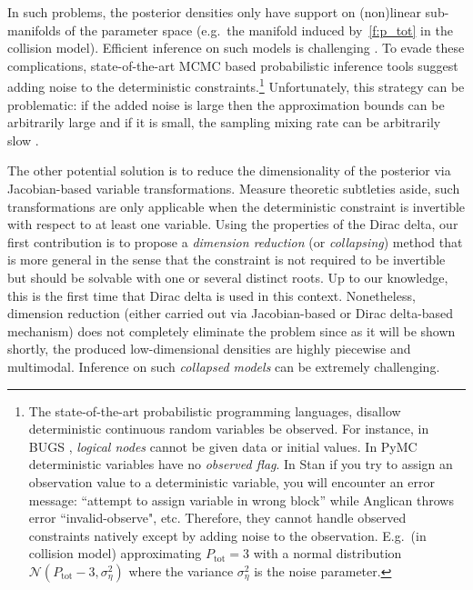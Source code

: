 In such problems, the posterior densities only have support on (non)linear sub-manifolds of the parameter space (e.g.\ the manifold induced by~\eqref{f:p_tot} in the collision model). 
Efficient inference on such models is challenging \cite{pennec2006intrinsic}. 
To evade these complications, state-of-the-art MCMC based probabilistic inference tools suggest adding noise to the deterministic constraints.\footnote{
%
The state-of-the-art probabilistic programming languages, disallow deterministic continuous random variables be observed. For instance, in BUGS \cite{lunn2009bugs}, \emph{logical nodes} cannot be given data or initial values. 
In PyMC \cite{patil2010pymc} deterministic variables have no \emph{observed flag}. 
In Stan \cite{stan-manual:2014} if you try to assign an observation value to a deterministic variable, you will encounter an error message: ``attempt to assign variable in wrong block'' while Anglican \cite{wood2014new} throws error ``invalid-observe", etc.
Therefore, they cannot handle observed constraints natively except by adding noise to the observation.
E.g.\  (in collision model) approximating $P_{\text{tot}} = 3$ with a normal distribution {\footnotesize $\mathcal{N}( P_{\text{tot}} - 3, \sigma_\eta^2)$} where the variance $\sigma_\eta^2$ is the noise parameter.}
%
Unfortunately, this strategy can be problematic: if the added noise is large then the approximation bounds can be arbitrarily large and if it is small, the sampling mixing rate can be arbitrarily slow \cite{li2013dynamic,chin1987bayesian}. 
 
The other potential solution is to reduce the dimensionality of the posterior via Jacobian-based variable transformations. Measure theoretic subtleties aside, such transformations are only applicable when the deterministic constraint is invertible with respect to at least one variable. Using the properties of the Dirac delta, our first contribution is to propose a \emph{dimension reduction} (or \emph{collapsing}) method that is more general in the sense that the constraint is not required to be invertible but should be solvable with one or several distinct roots. Up to our knowledge, this is the first time that Dirac delta is used in this context.
Nonetheless, dimension reduction (either carried out via Jacobian-based or Dirac delta-based mechanism) does not completely eliminate the problem since as it will be shown shortly, the produced low-dimensional densities are highly piecewise and multimodal. 
Inference on such \emph{collapsed models} can be extremely challenging. 


